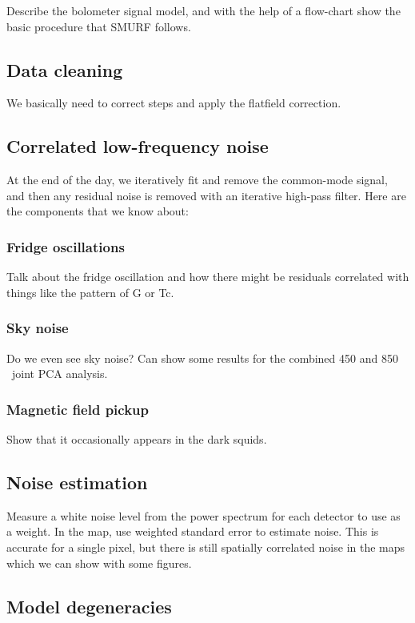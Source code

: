 \documentclass[useAMS,usenatbib,usegraphicx,nofootinbib]{mn2e}
\begin{document}
Describe the bolometer signal model, and with the help of a flow-chart
show the basic procedure that SMURF follows.

\subsection{Data cleaning}
We basically need to correct steps and apply the flatfield correction.




\subsection{Correlated low-frequency noise}
At the end of the day, we iteratively fit and remove the common-mode
signal, and then any residual noise is removed with an iterative
high-pass filter. Here are the components that we know about:

\subsubsection{Fridge oscillations}
Talk about the fridge oscillation and how there might be residuals
correlated with things like the pattern of G or Tc.

\subsubsection{Sky noise}
Do we even see sky noise? Can show some results for the combined 450
and 850\,\micron\ joint PCA analysis.

\subsubsection{Magnetic field pickup}
Show that it occasionally appears in the dark squids.




\subsection{Noise estimation}

Measure a white noise level from the power spectrum for each detector
to use as a weight. In the map, use weighted standard error to
estimate noise. This is accurate for a single pixel, but there is
still spatially correlated noise in the maps which we can show with
some figures.


\subsection{Model degeneracies}
\end{document}
